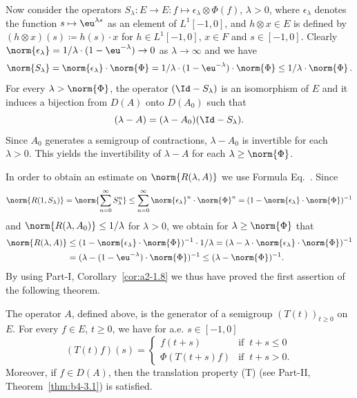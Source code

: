Now consider the operators $S_{\lambda} \colon E \to E \colon f \mapsto \epsilon_{\lambda} \otimes \Phi(f)$, $\lambda > 0$, where $\epsilon_{\lambda}$ denotes the function $s \mapsto \eu^{\lambda s}$ as an element of\/ $L^{1}[-1,0]$, 
and $h \otimes x \in E$ is defined by 
$(h \otimes x)(s) \coloneqq h(s) \cdot x$ for $h \in L^{1}[-1,0]$, $x \in F$ and $s \in [-1,0]$.
Clearly 
$\norm{\epsilon_{\lambda}} = 1/\lambda \cdot (1 - \eu^{-\lambda}) \to 0$ as $\lambda \to \infty$ and we have
\[
\norm{S_{\lambda}} = \norm{\epsilon_{\lambda}} \cdot \norm{\Phi} = 1/\lambda \cdot (1 - \eu^{-\lambda}) \cdot \norm{\Phi} \leq 1/\lambda \cdot \norm{\Phi}\,.
\]
For every $\lambda > \norm{\Phi}$, the operator $(\Id - S_{\lambda})$ is an isomorphism of\/ $E$ and it induces a bijection from $D(A)$ onto $D(A_{0})$ such that
\begin{equation}\label{eq:c4-3.2}
(\lambda - A) = (\lambda - A_{0})(\Id - S_{\lambda}).
\end{equation}
Since $A_{0}$ generates a semigroup of contractions, $\lambda - A_{0}$ is invertible for each $\lambda > 0$.
This yields the invertibility of\/ $\lambda - A$ for each $\lambda \geq \norm{\Phi}$.

In order to obtain an estimate on $\norm{R(\lambda,A)}$ we use Formula Eq.~.
Since 
\[ 
\norm{R(1,S_{\lambda})} = \norm{\sum_{n=0}^{\infty} S_{\lambda}^n} \leq \sum_{n=0}^{\infty} \norm{\epsilon_{\lambda}}^n \cdot \norm{\Phi}^n = (1-\norm{\epsilon_{\lambda}} \cdot \norm{\Phi})^{-1}
\]
and $\norm{R(\lambda,A_0)} \leq 1/\lambda$ for $\lambda > 0$, we obtain for $\lambda \geq \norm{\Phi}$ that
\begin{align*}
\norm{R(\lambda,A)} &\leq (1 - \norm{\epsilon_{\lambda}} \cdot \norm{\Phi})^{-1} \cdot 1/\lambda = (\lambda - \lambda \cdot \norm{\epsilon_{\lambda}} \cdot \norm{\Phi})^{-1} \\
&= (\lambda - (1 - \eu^{-\lambda}) \cdot \norm{\Phi})^{-1} \leq (\lambda - \norm{\Phi})^{-1}.
\end{align*}
By using Part-I, Corollary~\ref{cor:a2-1.8} we thus have proved the first assertion of the following theorem.
\begin{theorem}\label{thm:c4-3.1}
%
%
The operator $A$, defined above, is the generator of a semigroup $(T(t))_{t \geq 0}$ on $E$.
For every $f \in E$, $t \geq 0$, we have for a.e. $s \in [-1,0]$
\begin{equation}\label{eq:c4-3.3}
(T(t)f)(s) = \begin{cases}
    f(t+s) & \text{if } \ t+s \leq 0 \\
    \Phi(T(t+s)f) & \text{if } \ t+s > 0.
\end{cases}
\end{equation}
Moreover, if\/ $f \in D(A)$, then the translation property (T) (see Part-II, Theorem~\ref{thm:b4-3.1}) is satisfied.
\end{theorem}

